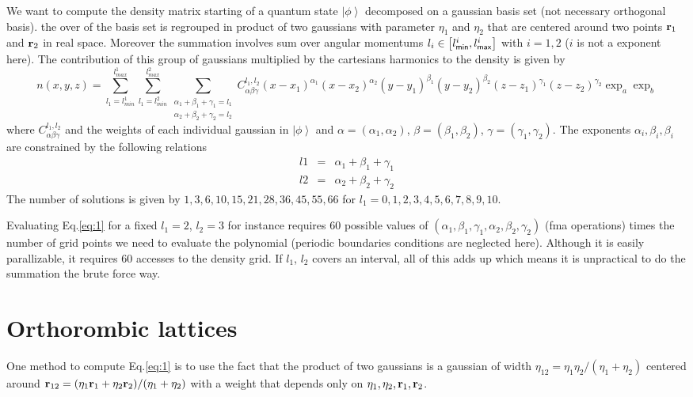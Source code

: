\documentclass[prb]{revtex4}
\begin{document}
We want to compute the density matrix starting of a quantum state
$\left|\phi\right>$ decomposed on a gaussian basis set (not necessary orthogonal
basis). the over of the basis set is regrouped in product of two gaussians with
parameter $\eta_1$ and $\eta_2$ that are centered around two points ${\bf r}_1$
and ${\bf r}_2$ in real space. Moreover the summation involves sum over angular
momentums $l_i\in\left[l_{\sf min}^i, l_{\sf max}^i\right]$ with $i=1,2$ ($i$ is
not a exponent here). The contribution of this group of gaussians multiplied by
the cartesians harmonics to the density is given by
\begin{equation}
  \label{eq:1}
  n(x,y,z) = \sum_{l_1 = l_{min}^1}^{l_{max}^1} \sum_{l_1 = l_{min}^2}^{l_{max}^2} \sum_{\substack{\alpha_1 + \beta_1 + \gamma_1 = l_1\\\alpha_2 + \beta_2 + \gamma_2 = l_2}} C^{l_1,l_2}_{\alpha\beta\gamma} (x-x_1)^{\alpha_1} (x-x_2)^{\alpha_2}(y-y_1)^{\beta_1} (y-y_2)^{\beta_2}(z-z_1)^{\gamma_1} (z-z_2)^{\gamma_2} \exp_a\exp_b
\end{equation}
where $C^{l_1,l_2}_{\alpha\beta\gamma}$ and the weights of each individual
gaussian in $\left|\phi\right>$ and $\alpha=(\alpha_1,\alpha_2)$,
$\beta=(\beta_1,\beta_2)$, $\gamma=(\gamma_1,\gamma_2)$. The exponents
$\alpha_i,\beta_i,\beta_i$ are constrained by the following relations
\begin{eqnarray}
  l1 &=& \alpha_1 + \beta_1 + \gamma_1\\
  l2 &=& \alpha_2 + \beta_2 + \gamma_2
\end{eqnarray}
The number of solutions is given by $1, 3, 6, 10, 15, 21, 28, 36, 45, 55, 66$
for $l_1 = 0, 1, 2, 3, 4, 5, 6, 7, 8, 9, 10$.

Evaluating Eq.\ref{eq:1} for a fixed $l_1 = 2$, $l_2 = 3$ for instance requires
$60$ possible values of $(\alpha_1,\beta_1,\gamma_1,\alpha_2,\beta_2,\gamma_2)$
(fma operations) times the number of grid points we need to evaluate the
polynomial (periodic boundaries conditions are neglected here). Although it is
easily parallizable, it requires 60 accesses to the density grid. If $l_1$,
$l_2$ covers an interval, all of this adds up which means it is unpractical to
do the summation the brute force way.

\section{Orthorombic lattices}
One method to compute Eq.\ref{eq:1} is to use the fact that the
product of two gaussians is a gaussian of width $\eta_{12} =
\eta_1\eta_2/(\eta_1 + \eta_2)$ centered around ${\bf r}_{12} = (\eta_1 {\bf
  r}_1 + \eta_2 {\bf r}_2)/ (\eta_1 + \eta_2)$ with a weight that depends only
on $\eta_1,\eta_2,{\bf r}_1,{\bf r}_2$.
\end{document}
